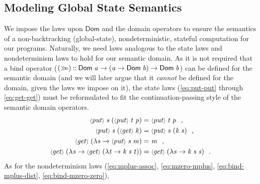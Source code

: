 \documentclass{llncs}
\newcommand{\Conid}[1]{\mathit{#1}}
\newcommand{\Varid}[1]{\mathit{#1}}
\let\Varid\mathit
\let\Conid\mathsf
\begin{document}
\subsection{Modeling Global State Semantics}
\label{sec:model-global-state-sem}
We impose the laws upon \ensuremath{\Conid{Dom}} and the domain operators to ensure the semantics of a
non-backtracking (global-state),
nondeterministic, stateful computation for our programs.
Naturally, we need laws analogous to the state laws and nondeterminism laws to
hold for our semantic domain.
As it is not required that a bind operator
(\ensuremath{(\mathrel{\hstretch{0.7}{>\!\!>\!\!=}})\mathbin{::}\Conid{Dom}\;\Varid{a}\to (\Varid{a}\to \Conid{Dom}\;\Varid{b})\to \Conid{Dom}\;\Varid{b}}) can be defined for the semantic
domain (and we will later argue that it \emph{cannot} be defined for the domain,
given the laws we impose on it), the state laws
(\eqref{eq:put-put} through \eqref{eq:get-get})
must be reformulated to fit the continuation-passing style of the semantic domain
operators.
\begin{align}
  \ensuremath{\scaleobj{0.8}{\langle}\Varid{put}\scaleobj{0.8}{\rangle}\;\Varid{s}\;(\scaleobj{0.8}{\langle}\Varid{put}\scaleobj{0.8}{\rangle}\;\Varid{t}\;\Varid{p})} &= \ensuremath{\scaleobj{0.8}{\langle}\Varid{put}\scaleobj{0.8}{\rangle}\;\Varid{t}\;\Varid{p}} \mbox{~~,} \label{eq:put-put-g-d} \\
  \ensuremath{\scaleobj{0.8}{\langle}\Varid{put}\scaleobj{0.8}{\rangle}\;\Varid{s}\;(\scaleobj{0.8}{\langle}\Varid{get}\scaleobj{0.8}{\rangle}\;\Varid{k})} &= \ensuremath{\scaleobj{0.8}{\langle}\Varid{put}\scaleobj{0.8}{\rangle}\;\Varid{s}\;(\Varid{k}\;\Varid{s})} \mbox{~~,} \label{eq:put-get-g-d} \\
  \ensuremath{\scaleobj{0.8}{\langle}\Varid{get}\scaleobj{0.8}{\rangle}\;(\lambda \Varid{s}\to \scaleobj{0.8}{\langle}\Varid{put}\scaleobj{0.8}{\rangle}\;\Varid{s}\;\Varid{m})} &= \ensuremath{\Varid{m}} \mbox{~~,} \label{eq:get-put-g-d} \\
  \ensuremath{\scaleobj{0.8}{\langle}\Varid{get}\scaleobj{0.8}{\rangle}\;(\lambda \Varid{s}\to \scaleobj{0.8}{\langle}\Varid{get}\scaleobj{0.8}{\rangle}\;(\lambda \Varid{t}\to \Varid{k}\;\Varid{s}\;\Varid{t}))} &= \ensuremath{\scaleobj{0.8}{\langle}\Varid{get}\scaleobj{0.8}{\rangle}\;(\lambda \Varid{s}\to \Varid{k}\;\Varid{s}\;\Varid{s})} \mbox{~~.} \label{eq:get-get-g-d}
\end{align}
As for the nondeterminism laws
(\eqref{eq:mplus-assoc}, \eqref{eq:mzero-mplus}, \eqref{eq:bind-mplus-dist},
\eqref{eq:bind-mzero-zero}),
\end{document}
